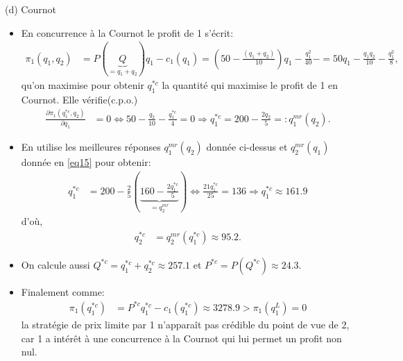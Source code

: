 \begin{frame}[allowframebreaks]{(d) Cournot}
    \begin{itemize}
        \item En concurrence à la Cournot le profit de 1 s'écrit: 
        \begin{align}
            \pi_1(q_1, q_2) &= P(\underbrace{Q}_{=q_1+ q_2})q_1 - c_1(q_1) = \left(50-\frac{(q_1+q_2)}{10}\right)q_1  - \frac{q_1^2}{40}   -
            =  50 q_1 -\frac{q_1q_2}{10} - \frac{q_1^2}{8},
            \label{eq16}
        \end{align}
        qu'on maximise pour obtenir $q_1^{*c}$ la quantité qui maximise le profit de 1 en Cournot. Elle vérifie(c.p.o.)
        \begin{align}
            \frac{\partial \pi_1(q_1^{*c}, q_2)}{\partial q_1} &= 0 \Leftrightarrow 50 - \frac{q_2}{10} -  
            \frac{q_1^{*c}}{4} = 0 \Rightarrow q_1^{*c} = 200-\frac{2 q_2}{5} =: q_1^{mr}(q_2).
            \label{eq17}
        \end{align}
        \item En utilise les meilleures réponses $q_1^{mr}(q_2)$ donnée ci-dessus et $q_2^{mr}(q_1)$ donnée en \eqref{eq15} pour obtenir: 
        \begin{align*}
            q_1^{*c} &= 200-\frac{2}{5}\left( \underbrace{160 - \frac{2q_1^{*c}}{5}}_{=q_2^{mr}} \right)   
            \Leftrightarrow \frac{21q_1^{*c}}{25} = 136     \Rightarrow    q_1^{*c} \approx 161.9
         \end{align*}
         d'où, 
         \begin{align*}
            q_2^{*c} &= q_2^{mr}(q_1^{*c}) \approx 95.2.
        \end{align*}
        \item On calcule aussi $Q^{*c} = q_1^{*c} + q_2^{*c}\approx 257.1$ et $P^{*c} = P(Q^{*c}) \approx 24.3$.
        \item Finalement comme: 
        \begin{align*}
          \pi_1(q_1^{*c}) &=  P^{*c}q_1^{*c} - c_1(q_1^{*c}) \approx 3278.9 > \pi_1(q_1^L) = 0
        \end{align*}
        la stratégie de prix limite par 1 n'apparaît pas crédible du point de vue de 2, car 1 a intérêt à une
         concurrence à la Cournot qui lui permet un profit non nul. 
    \end{itemize}
\end{frame}




